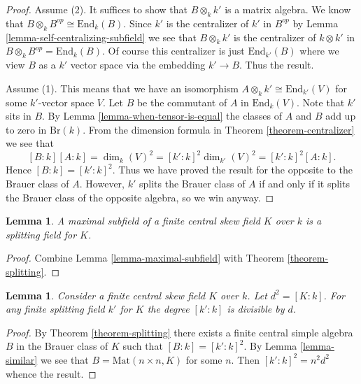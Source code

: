 \documentclass{stacks-project}
\theoremstyle{plain}
\newtheorem{lemma}[subsection]{Lemma}
\theoremstyle{definition}
\theoremstyle{remark}
\numberwithin{equation}{subsection}
\begin{document}
\begin{proof}
Assume (2). It suffices to show that $B \otimes_k k'$ is a matrix
algebra. We know that $B \otimes_k B^{op} \cong \text{End}_k(B)$.
Since $k'$ is the centralizer of $k'$ in $B^{op}$ by
Lemma \ref{lemma-self-centralizing-subfield}
we see that $B \otimes_k k'$ is the centralizer of $k \otimes k'$
in $B \otimes_k B^{op} = \text{End}_k(B)$. Of course this centralizer
is just $\text{End}_{k'}(B)$ where we view $B$ as a $k'$ vector space
via the embedding $k' \to B$. Thus the result.

\medskip\noindent
Assume (1). This means that we have an isomorphism
$A \otimes_k k' \cong \text{End}_{k'}(V)$ for some $k'$-vector space $V$.
Let $B$ be the commutant of $A$ in $\text{End}_k(V)$. Note that
$k'$ sits in $B$. By
Lemma \ref{lemma-when-tensor-is-equal}
the classes of $A$ and $B$ add up to zero in $\text{Br}(k)$.
From the dimension formula in
Theorem \ref{theorem-centralizer}
we see that
$$
[B : k] [A : k] =
\dim_k(V)^2 =
[k' : k]^2 \dim_{k'}(V)^2 =
[k' : k]^2 [A : k].
$$
Hence $[B : k] = [k' : k]^2$. Thus we have proved the result for the
opposite to the Brauer class of $A$. However, $k'$ splits the Brauer
class of $A$ if and only if it splits
the Brauer class of the opposite algebra, so we win anyway.
\end{proof}

\begin{lemma}
\label{lemma-maximal-subfield-splits}
A maximal subfield of a finite central skew field $K$ over $k$ is
a splitting field for $K$.
\end{lemma}

\begin{proof}
Combine Lemma \ref{lemma-maximal-subfield} with
Theorem \ref{theorem-splitting}.
\end{proof}

\begin{lemma}
\label{lemma-splitting-field-degree}
Consider a finite central skew field $K$ over $k$. Let $d^2 = [K : k]$.
For any finite splitting field $k'$ for $K$ the degree $[k' : k]$ is
divisible by $d$.
\end{lemma}

\begin{proof}
By Theorem \ref{theorem-splitting} there exists a finite central
simple algebra $B$ in the Brauer class of $K$ such that
$[B : k] = [k' : k]^2$. By
Lemma \ref{lemma-similar}
we see that $B = \text{Mat}(n \times n, K)$ for some $n$.
Then $[k' : k]^2 = n^2d^2$ whence the result.
\end{proof}
\end{document}
